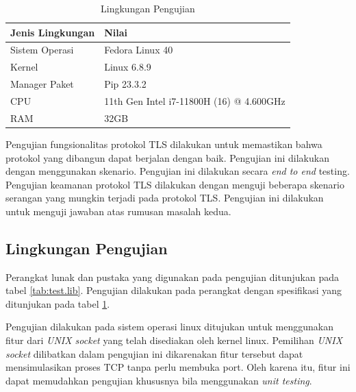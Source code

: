 \begin{table}[!h]
  \centering
  \caption{Lingkungan Pengujian} \label{tab:test.env}
  \begin{tabular}{|p{3cm}|p{6cm}|}
    \hline
    Jenis Lingkungan & Nilai \\ \hline
    Sistem Operasi & Fedora Linux 40 \\ \hline
    Kernel & Linux 6.8.9 \\ \hline
    Manager Paket & Pip 23.3.2 \\ \hline
    CPU & 11th Gen Intel i7-11800H (16) @ 4.600GHz \\ \hline
    RAM & 32GB \\ \hline
  \end{tabular}
\end{table}


Pengujian fungsionalitas protokol TLS dilakukan untuk memastikan bahwa protokol yang dibangun dapat berjalan dengan baik. Pengujian ini dilakukan dengan menggunakan skenario. Pengujian ini dilakukan secara \emph{end to end} testing. Pengujian keamanan protokol TLS dilakukan dengan menguji beberapa skenario serangan yang mungkin terjadi pada protokol TLS. Pengujian ini dilakukan untuk menguji jawaban atas rumusan masalah kedua.

\subsection{Lingkungan Pengujian}
Perangkat lunak dan pustaka yang digunakan pada pengujian ditunjukan pada tabel \ref{tab:test.lib}. Pengujian dilakukan pada perangkat dengan spesifikasi yang ditunjukan pada tabel \ref{tab:test.env}. 

Pengujian dilakukan pada sistem operasi linux ditujukan untuk menggunakan fitur dari \emph{UNIX socket} yang telah disediakan oleh kernel linux. Pemilihan \emph{UNIX socket} dilibatkan dalam pengujian ini dikarenakan fitur tersebut dapat mensimulasikan proses TCP tanpa perlu membuka port. Oleh karena itu, fitur ini dapat memudahkan pengujian khususnya bila menggunakan \emph{unit testing}.


